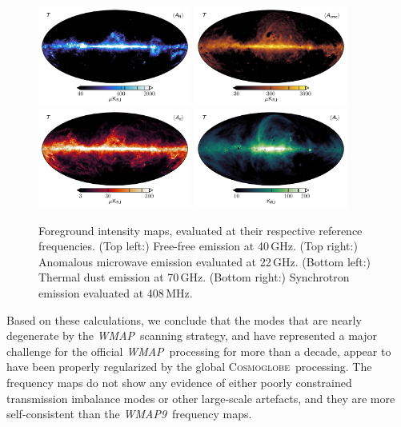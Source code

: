 \documentclass[twocolumn]{../../common/aa}
\def\WMAP{\emph{WMAP}}
\def\WMAPnine{\emph{WMAP9}}
\newcommand{\cosmoglobe}{\textsc{Cosmoglobe}}
\begin{document}
\begin{figure}
	\centering
	\includegraphics[width=0.45\textwidth]{figures/ff_I.pdf}
	\includegraphics[width=0.45\textwidth]{figures/ame_I.pdf}\\
	\includegraphics[width=0.45\textwidth]{figures/dust_I.pdf}
	\includegraphics[width=0.45\textwidth]{figures/synch_I.pdf}\\
	\caption{Foreground intensity maps, evaluated at their respective reference frequencies. (Top left:) Free-free emission at 40\,GHz. (Top right:) Anomalous microwave emission evaluated at 22\,GHz. (Bottom left:) Thermal dust emission at 70\,GHz. (Bottom right:) Synchrotron emission evaluated at 408\,MHz.}\label{fig:intensity_foregrounds}
\end{figure}



Based on these calculations, we conclude that the modes that are nearly degenerate by the \WMAP\ scanning strategy, and have represented a major challenge for the official \WMAP\ processing for more than a decade, appear to have been properly regularized by the global \cosmoglobe\ processing. The frequency maps do not show any evidence of either poorly constrained transmission imbalance modes or other large-scale artefacts, and they are more self-consistent than the \WMAPnine\ frequency maps.
\end{document}
